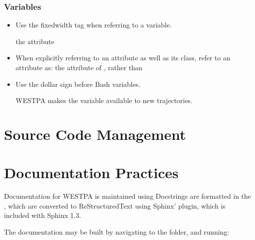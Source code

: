 \documentclass[letterpaper,10pt,english]{sphinxmanual}
\begin{document}
\subsubsection{Variables}
\label{\detokenize{development/style_guide:variables}}\begin{itemize}
\item {} 
Use the fixed\sphinxhyphen{}width \sphinxcode{\sphinxupquote{\textasciigrave{}\textasciigrave{}}} tag when referring to a variable.

the  attribute

\item {} 
When explicitly referring to an attribute as well as its class, refer to an
attribute as: the  attribute of , rather than

\item {} 
Use the \sphinxcode{\sphinxupquote{\$}} dollar sign before Bash variables.

WESTPA makes the variable  available to new
trajectories.

\end{itemize}


\section{Source Code Management}
\label{\detokenize{development/source_code:source-code-management}}\label{\detokenize{development/source_code::doc}}

\section{Documentation Practices}
\label{\detokenize{development/documentation:documentation-practices}}\label{\detokenize{development/documentation::doc}}
Documentation for WESTPA is maintained using 
Docstrings are formatted in the ,
which are converted to ReStructuredText using Sphinx’  plugin, which is
included with Sphinx 1.3.

The documentation may be built by navigating to the  folder, and
running:
\end{document}
